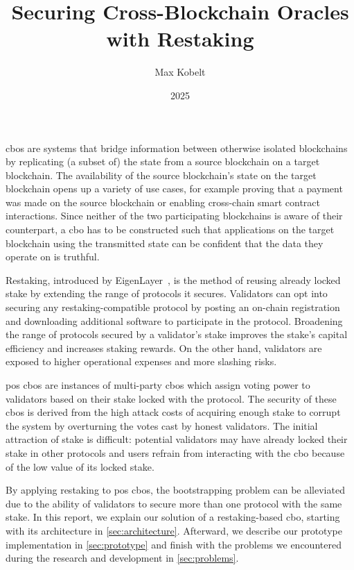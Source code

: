 \documentclass{article}
\begin{document}
	\title{Securing Cross-Blockchain Oracles with Restaking}
	\author{Max Kobelt}
	\date{2025}
	\maketitle
	
	\Glspl{cbo} are systems that bridge information between otherwise isolated blockchains by replicating (a subset of) the state from a source blockchain on a target blockchain.
	The availability of the source blockchain's state on the target blockchain opens up a variety of use cases, for example proving that a payment was made on the source blockchain or enabling cross-chain smart contract interactions.
	Since neither of the two participating blockchains is aware of their counterpart, a \gls{cbo} has to be constructed such that applications on the target blockchain using the transmitted state can be confident that the data they operate on is truthful.
	
	Restaking, introduced by EigenLayer~\cite{eigenlayer}, is the method of reusing already locked stake by extending the range of protocols it secures.
	Validators can opt into securing any restaking-compatible protocol by posting an on-chain registration and downloading additional software to participate in the protocol.
	Broadening the range of protocols secured by a validator's stake improves the stake's capital efficiency and increases staking rewards.
	On the other hand, validators are exposed to higher operational expenses and more slashing risks.
	
	\Gls{pos} \glspl{cbo} are instances of multi-party \glspl{cbo} which assign voting power to validators based on their stake locked with the protocol.
	The security of these \glspl{cbo} is derived from the high attack costs of acquiring enough stake to corrupt the system by overturning the votes cast by honest validators.
	The initial attraction of stake is difficult: potential validators may have already locked their stake in other protocols and users refrain from interacting with the \gls{cbo} because of the low value of its locked stake.
	
	By applying restaking to \gls{pos} \glspl{cbo}, the bootstrapping problem can be alleviated due to the ability of validators to secure more than one protocol with the same stake.
	In this report, we explain our solution of a restaking-based \gls{cbo}, starting with its architecture in \cref{sec:architecture}.
	Afterward, we describe our prototype implementation in \cref{sec:prototype} and finish with the problems we encountered during the research and development in \cref{sec:problems}.
	
\end{document}
